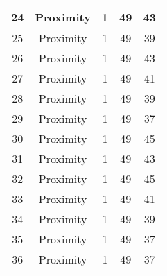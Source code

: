 \documentclass[results.tex]{subfiles}
\begin{document}
\begin{center}
\begin{tabular}{| c || c | c | c | c |}
            \hline
            24                      & Proximity                    & 1                      & 49                      & 43                   \\
            \hline
            25                      & Proximity                    & 1                      & 49                      & 39                   \\
            \hline
            26                      & Proximity                    & 1                      & 49                      & 43                   \\
            \hline
            27                      & Proximity                    & 1                      & 49                      & 41                   \\
            \hline
            28                      & Proximity                    & 1                      & 49                      & 39                   \\
            \hline
            29                      & Proximity                    & 1                      & 49                      & 37                   \\
            \hline
            30                      & Proximity                    & 1                      & 49                      & 45                   \\
            \hline
            31                      & Proximity                    & 1                      & 49                      & 43                   \\
            \hline
            32                      & Proximity                    & 1                      & 49                      & 45                   \\
            \hline
            33                      & Proximity                    & 1                      & 49                      & 41                   \\
            \hline
            34                      & Proximity                    & 1                      & 49                      & 39                   \\
            \hline
            35                      & Proximity                    & 1                      & 49                      & 37                   \\
            \hline
            36                      & Proximity                    & 1                      & 49                      & 37                   \\

\end{tabular}
\end{center}
\end{document}

